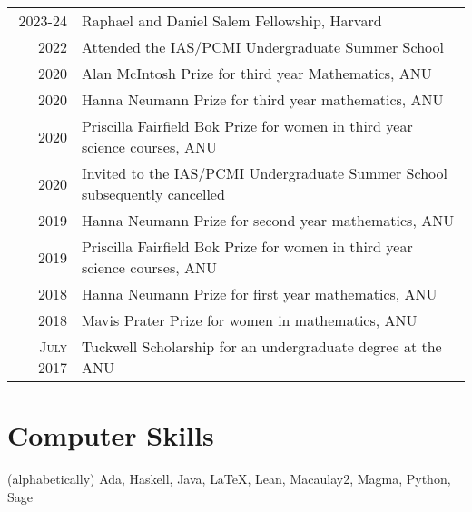 \documentclass[a4paper,11pt]{article} %
\begin{document}
\begin{tabular}{rl}
2023-24 & Raphael and Daniel Salem Fellowship, \footnotesize Harvard \normalsize\\

2022 & Attended the IAS/PCMI Undergraduate Summer School\\

2020 & Alan McIntosh Prize \footnotesize for third year Mathematics, ANU \normalsize\\

2020 & Hanna Neumann Prize \footnotesize for third year mathematics, ANU \normalsize\\

2020 & Priscilla Fairfield Bok Prize \footnotesize for women in third year science courses, ANU \normalsize\\

2020 & Invited to the IAS/PCMI Undergraduate Summer School \footnotesize subsequently cancelled\\

2019 & Hanna Neumann Prize \footnotesize for second year mathematics, ANU \normalsize\\

2019 & Priscilla Fairfield Bok Prize \footnotesize for women in third year science courses, ANU \normalsize\\

2018 & Hanna Neumann Prize \footnotesize for first year mathematics, ANU \normalsize\\

2018 & Mavis Prater Prize \footnotesize for women in mathematics, ANU \normalsize\\

\textsc{July} 2017 & Tuckwell Scholarship \footnotesize for an undergraduate degree at the ANU\\

\end{tabular}


\section{Computer Skills}

(alphabetically) Ada, Haskell, Java, {\fb \LaTeX}, Lean, Macaulay2, Magma, Python, Sage
\end{document}
